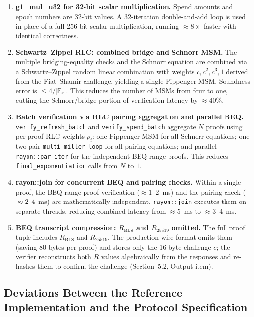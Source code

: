 \documentclass[11pt]{article}
\theoremstyle{definitionstyle}
\theoremstyle{plain}
\begin{document}
\begin{enumerate}[leftmargin=*,label=\textbf{O\arabic*.}]
\item \textbf{g1\_mul\_u32 for 32-bit scalar multiplication.}
  Spend amounts and epoch numbers are 32-bit values.  A 32-iteration
  double-and-add loop is used in place of a full 256-bit scalar
  multiplication, running $\approx 8\times$ faster with identical correctness.

\item \textbf{Schwartz--Zippel RLC: combined bridge and Schnorr MSM.}
  The multiple bridging-equality checks and the Schnorr equation are combined
  via a Schwartz--Zippel random linear combination with weights
  $c, c^2, c^3, 1$ derived from the Fiat--Shamir challenge, yielding a single
  Pippenger MSM.  Soundness error is $\le 4/|\mathbb{F}_r|$.  This reduces
  the number of MSMs from four to one, cutting the Schnorr/bridge portion of
  verification latency by $\approx 40\%$.

\item \textbf{Batch verification via RLC pairing aggregation and parallel BEQ.}
  \nolinkurl{verify_refresh_batch} and \nolinkurl{verify_spend_batch} aggregate
  $N$ proofs using per-proof RLC weights $\rho_i$: one Pippenger MSM for all
  Schnorr equations; one two-pair \nolinkurl{multi_miller_loop} for all
  pairing equations; and parallel \nolinkurl{rayon::par_iter} for the
  independent BEQ range proofs.  This reduces
  \nolinkurl{final_exponentiation} calls from $N$ to $1$.

\item \textbf{rayon::join for concurrent BEQ and pairing checks.}
  Within a single proof, the BEQ range-proof verification ($\approx 1$--$2$~ms)
  and the pairing check ($\approx 2$--$4$~ms) are mathematically independent.
  \texttt{rayon::join} executes them on separate threads, reducing combined
  latency from $\approx 5$~ms to $\approx 3$--$4$~ms.

\item \textbf{BEQ transcript compression: $R_{\text{BLS}}$ and $R_{25519}$ omitted.}
  The full proof tuple includes $R_{\text{BLS}}$ and $R_{25519}$.  The
  production wire format omits them (saving 80 bytes per proof) and stores
  only the 16-byte challenge $c$; the verifier reconstructs both $R$ values
  algebraically from the responses and re-hashes them to confirm the challenge
  (Section~5.2, Output item).

\end{enumerate}

\subsection{Deviations Between the Reference Implementation and the Protocol Specification}
\label{sec:deviations}
\end{document}
